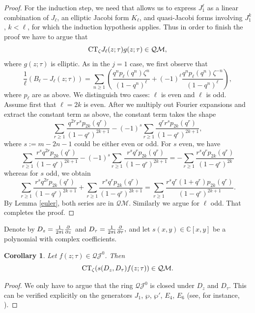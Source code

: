 \documentclass[10pt,a4paper]{amsart}
\numberwithin{equation}{section}
\newtheorem{Corollary}[Theorem]{Corollary}
\theoremstyle{definition}
\begin{document}
\begin{proof}
For the induction step, we need \cite[formula~(11)]{Ob-Serre} that allows us to express $J_1^\ell$ as a linear combination of $J_\ell$, an elliptic Jacobi form $K_\ell$, and quasi-Jacobi forms involving $J_1^k$, $k < \ell$, for which the induction hypothesis applies.
Thus in order to finish the proof we have to argue that
\[
{\rm CT}_\zeta J_\ell(z;\tau) g(z;\tau) \in \mathcal{QM},
\]
where $g(z;\tau)$ is elliptic. As in the $j=1$ case, we first observe that
\[
\frac{1}{\ell}(B_{\ell}-J_{\ell}(z;\tau))=\sum_{n \geq 1}\left( \frac{q^n p_\ell(q^n) \zeta^n}{(1-q^n)^\ell} + (-1)^\ell \frac{q^n p_\ell(q^n) \zeta^{-n}}{(1-q^n)^\ell} \right),
\]
where $p_\ell$ are as above. We distinguish two cases: $\ell$ is even and $\ell$ is odd.
Assume first that $\ell=2k$ is even.
After we multiply out Fourier expansions and extract the constant term as above, the constant term takes the shape
\[
\sum_{r \geq 1} \frac{q^{2r} r^s p_{2k}(q^r)}{(1-q^r)^{2k+1}} - (-1)^{s} \sum_{r \geq 1} \frac{q^{r} r^s p_{2k}(q^r)}{(1-q^r)^{2k+1}},
\]
where $s:=m - 2 n-1$ could be either even or odd. For $s$ even, we have
\begin{equation*} %
\sum_{r \geq 1} \frac{r^s q^{2r} p_{2k}(q^r)}{(1-q^r)^{2k+1}} - (-1)^{s} \sum_{r \geq 1} \frac{r^s q^{r} p_{2k}(q^r)}{(1-q^r)^{2k+1}}=- \sum_{r \geq 1} \frac{r^s q^{r}p_{2k}(q^r)}{(1-q^r)^{2k}}
\end{equation*}
whereas for $s$ odd, we obtain
\begin{equation*} %
\sum_{r \geq 1} \frac{r^s q^{2r} p_{2k} (q^r)}{(1-q^r)^{2k+1}} + \sum_{r \geq 1} \frac{r^s q^{r} p_{2k}(q^r)}{(1-q^r)^{2k+1}}=\sum_{r \geq 1} \frac{r^s q^{r}(1+q^r) p_{2k}(q^r)}{(1-q^r)^{2k+1}}.
\end{equation*}
By Lemma \ref{euler}, both series are in $\mathcal{QM}$.
Similarly we argue for $\ell$ odd. That completes the proof.
\end{proof}

Denote by $D_z=\frac{1}{2 \pi {\rm i} } \frac{\partial}{\partial z}$ and ${D}_\tau=\frac{1}{2 \pi {\rm i}} \frac{\partial}{\partial \tau},$ and let $s(x,y) \in \mathbb{C}[x,y]$ be a polynomial with complex coefficients.
\begin{Corollary} \label{const} Let $f(z;\tau) \in \mathcal{QJ}^{0}$. Then
\[
{\rm CT}_\zeta (s(D_z,D_\tau) f(z;\tau) ) \in \mathcal{QM}.
\]
\end{Corollary}
\begin{proof} We only have to argue that the ring $\mathcal{QJ}^{0}$ is closed under $D_z$ and $D_\tau$. This can be verified explicitly on the generators $J_1$, $\wp$, $\wp'$, $E_4$, $E_6$ (see, for instance, \cite{Ob, Ittersum}).
\end{proof}
\end{document}
